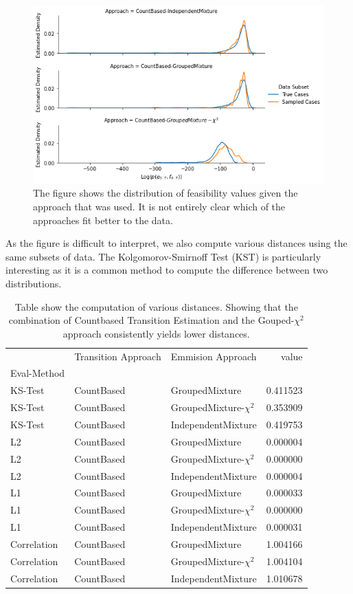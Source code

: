 \documentclass[./../../paper.tex]{subfiles}
\begin{document}
\begin{figure}
    \centering
    \includegraphics[width=\textwidth]{figures/results/result_distributions.png}
    \caption{The figure shows the distribution of feasibility values given the approach that was used. It is not entirely clear which of the approaches fit better to the data.}
    \label{fig:distributions}
\end{figure}

As the figure is difficult to interpret, we also compute various distances using the same subsets of data. The Kolgomorov-Smirnoff Test (KST) is particularly interesting as it is a common method to compute the difference between two distributions.

\begin{table}
    \caption{Table show the computation of various distances. Showing that the combination of Countbased Transition Estimation and the Gouped-$\chi^2$ approach consistently yields lower distances.}
    \label{tbl:distributions}
    \begin{tabular}{lllr}
     & Transition Approach & Emmision Approach & value \\
    Eval-Method &  &  &  \\
    KS-Test & CountBased & GroupedMixture & 0.411523 \\
    KS-Test & CountBased & GroupedMixture-$\chi^2$ & 0.353909 \\
    KS-Test & CountBased & IndependentMixture & 0.419753 \\
    L2 & CountBased & GroupedMixture & 0.000004 \\
    L2 & CountBased & GroupedMixture-$\chi^2$ & 0.000000 \\
    L2 & CountBased & IndependentMixture & 0.000004 \\
    L1 & CountBased & GroupedMixture & 0.000033 \\
    L1 & CountBased & GroupedMixture-$\chi^2$ & 0.000000 \\
    L1 & CountBased & IndependentMixture & 0.000031 \\
    Correlation & CountBased & GroupedMixture & 1.004166 \\
    Correlation & CountBased & GroupedMixture-$\chi^2$ & 1.004104 \\
    Correlation & CountBased & IndependentMixture & 1.010678 \\
    \end{tabular}
\end{table}
\end{document}
